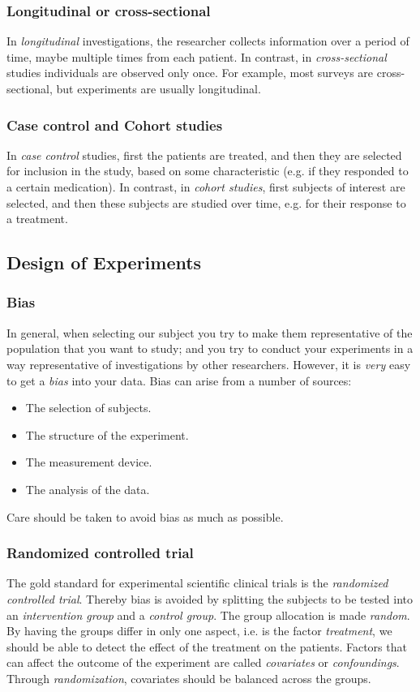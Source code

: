 \subsubsection{Longitudinal or cross-sectional}
In \emph{longitudinal} investigations, the researcher collects information over a period of time, maybe multiple times from each patient. In contrast, in \emph{cross-sectional} studies individuals are observed only once. For example, most surveys are cross-sectional, but experiments are usually longitudinal.

\subsubsection{Case control and Cohort studies}
In \emph{case control} studies, first the patients are treated, and then they are selected for inclusion in the study, based on some characteristic (e.g. if they responded to a certain medication). In contrast, in \emph{cohort studies}, first subjects of interest are selected, and then these subjects are studied over time, e.g. for their response to a treatment.

\subsection{Design of Experiments}

\subsubsection{Bias} 
In general, when selecting our subject you try to make them representative of the population that you want to study; and you try to conduct your experiments in a way representative of investigations by other researchers. However, it is \emph{very} easy to get a \emph{bias} into your data. Bias can arise from a number of sources:
\begin{itemize}
  \item The selection of subjects.
  \item The structure of the experiment.
  \item The measurement device.
  \item The analysis of the data.
\end{itemize}
Care should be taken to avoid bias as much as possible.

\subsubsection{Randomized controlled trial} 
The gold standard for experimental scientific clinical trials is the \emph{randomized controlled trial}. Thereby bias is avoided by splitting the subjects to be tested into an \emph{intervention group} and a \emph{control group}. The group allocation is made \emph{random}. By having the groups differ in only one aspect, i.e. is the factor \emph{treatment}, we should be able to detect the effect of the treatment on the patients.
Factors that can affect the outcome of the experiment are called \emph{covariates} or \emph{confoundings}. Through \emph{randomization}, covariates should be balanced across the groups.

